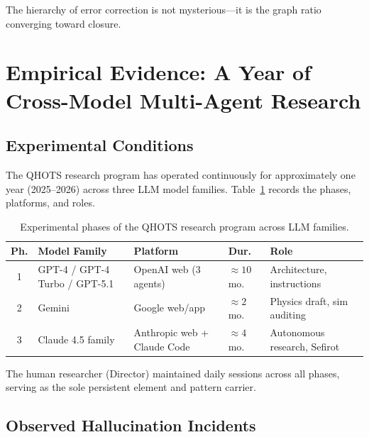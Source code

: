 \documentclass[11pt]{article}
\theoremstyle{definition}
\theoremstyle{remark}
\begin{document}
The hierarchy of error correction is not mysterious---it is the graph ratio
converging toward closure.

\section{Empirical Evidence: A Year of Cross-Model Multi-Agent Research}
\label{sec:empirical}

\subsection{Experimental Conditions}
\label{sec:experimental-conditions}

The QHOTS research program has operated continuously for approximately one year
(2025--2026) across three LLM model families.
Table~\ref{tab:experimental-phases} records the phases, platforms, and roles.

\begin{table}[ht]
\centering
\caption{Experimental phases of the QHOTS research program across LLM families.}
\label{tab:experimental-phases}
\begin{tabular}{@{}cp{3.2cm}p{3.2cm}ll@{}}
\toprule
\textbf{Ph.} & \textbf{Model Family} & \textbf{Platform}
  & \textbf{Dur.} & \textbf{Role} \\
\midrule
1 & GPT-4 / GPT-4 Turbo / GPT-5.1 & OpenAI web (3 agents)
  & ${\approx}10$ mo. & Architecture, instructions \\
2 & Gemini & Google web/app
  & ${\approx}2$ mo.  & Physics draft, sim auditing \\
3 & Claude 4.5 family & Anthropic web + Claude Code
  & ${\approx}4$ mo.  & Autonomous research, Sefirot \\
\bottomrule
\end{tabular}
\end{table}

The human researcher (Director) maintained daily sessions across all phases,
serving as the sole persistent element and pattern carrier.

\subsection{Observed Hallucination Incidents}
\label{sec:hallucination-incidents}
\end{document}
